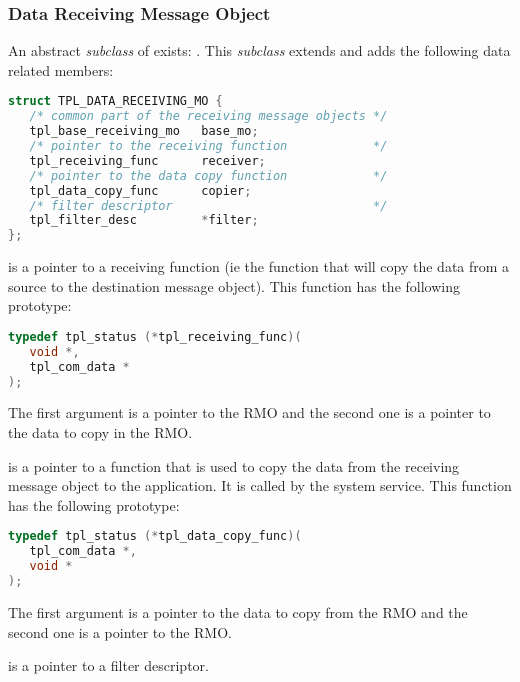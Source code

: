 \subsubsection{Data Receiving Message Object}

An abstract {\em subclass} of  exists: . This {\em subclass} extends  and adds the following data related members:

\begin{lstlisting}[language=C]
struct TPL_DATA_RECEIVING_MO {
   /* common part of the receiving message objects */
   tpl_base_receiving_mo   base_mo;
   /* pointer to the receiving function            */
   tpl_receiving_func      receiver;
   /* pointer to the data copy function            */
   tpl_data_copy_func      copier;
   /* filter descriptor                            */
   tpl_filter_desc         *filter;
};
\end{lstlisting}

 is a pointer to a receiving function (ie the function that will copy the data from a source to the destination message object). This function has the following prototype:

\begin{lstlisting}[language=C]
typedef tpl_status (*tpl_receiving_func)(
   void *,
   tpl_com_data *
);
\end{lstlisting}

The first argument is a pointer to the RMO and the second one is a pointer to the data to copy in the RMO.

 is a pointer to a function that is used to copy the data from the receiving message object to the application. It is called by the  system service. This function has the following prototype:

\begin{lstlisting}[language=C]
typedef tpl_status (*tpl_data_copy_func)(
   tpl_com_data *,
   void *
);
\end{lstlisting}

The first argument is a pointer to the data to copy from the RMO and the second one is a pointer to the RMO.


 is a pointer to a filter descriptor.


\label{sec:receivingmo}